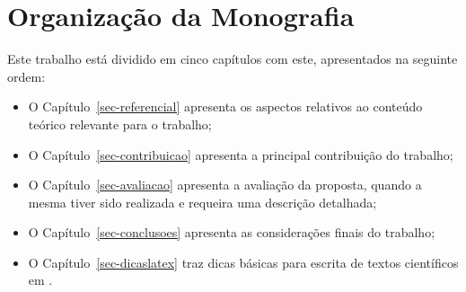 \section{Organização da Monografia}
\label{sec-intro-organizacao}

Este trabalho está dividido em cinco capítulos com este, apresentados na seguinte ordem:


\begin{itemize}
	\item O Capítulo~\ref{sec-referencial} apresenta os aspectos relativos ao conteúdo teórico relevante para o trabalho;
	
	\item O Capítulo~\ref{sec-contribuicao} apresenta a principal contribuição do trabalho;
	
	\item O Capítulo~\ref{sec-avaliacao} apresenta a avaliação da proposta, quando a mesma tiver sido realizada e requeira uma descrição detalhada;
	
	\item O Capítulo~\ref{sec-conclusoes} apresenta as considerações finais do trabalho;
	
	\item O Capítulo~\ref{sec-dicaslatex} traz dicas básicas para escrita de textos científicos em \latex.
\end{itemize}


